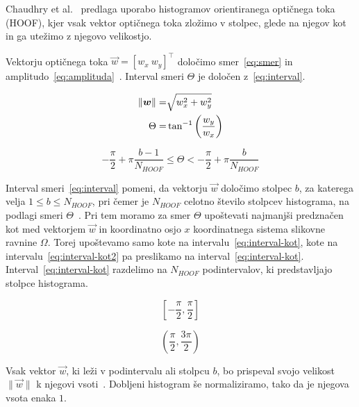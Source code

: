 Chaudhry et al.~\cite{chaudhry2009histograms} predlaga uporabo histogramov orientiranega optičnega toka (HOOF), kjer vsak vektor optičnega toka zložimo v stolpec, glede na njegov kot in ga utežimo z njegovo velikostjo.

Vektorju optičnega toka $\vec{w} = [w_x~w_y]^\top$ določimo smer~\eqref{eq:smer} in amplitudo~\eqref{eq:amplituda}~\cite{chaudhry2009histograms}. Interval smeri $\Theta$ je določen z~\eqref{eq:interval}. 

\begin{align}
    \left\lVert {\boldsymbol{w}} \right\rVert = & \sqrt{w_x^2 + w_y^2} \label{eq:amplituda} \\
    \Theta = & \tan^{-1}\left( \frac{w_y}{w_x} \right) \label{eq:smer}
\end{align}


\begin{equation}\label{eq:interval}
	-\frac{\pi}{2} + \pi \frac{b - 1}{N_{HOOF}} \leq \Theta < - \frac{\pi}{2} + \pi \frac{b}{N_{HOOF}}
\end{equation}


Interval smeri~\eqref{eq:interval} pomeni, da vektorju $\vec{w}$ določimo stolpec $b$, za katerega velja $1 \leq b \leq N_{HOOF}$, pri čemer je $N_{HOOF}$ celotno število stolpcev histograma, na podlagi smeri $\Theta$~\cite{chaudhry2009histograms}. Pri tem moramo za smer $\Theta$ upoštevati najmanjši predznačen kot med vektorjem $\vec{w}$ in koordinatno osjo $x$ koordinatnega sistema slikovne ravnine $\varOmega$. Torej upoštevamo samo kote na intervalu~\eqref{eq:interval-kot}, kote na intervalu~\eqref{eq:interval-kot2} pa preslikamo na interval~\eqref{eq:interval-kot}. Interval~\eqref{eq:interval-kot} razdelimo na $N_{HOOF}$ podintervalov, ki predstavljajo stolpce histograma. 

\begin{equation}\label{eq:interval-kot}
	\left[-\frac{\pi}{2}, \frac{\pi}{2}\right]
\end{equation}

\begin{equation}\label{eq:interval-kot2}
	\left(\frac{\pi}{2},\frac{3\pi}{2}\right)
\end{equation}

Vsak vektor $\vec{w}$, ki leži v podintervalu ali stolpcu $b$, bo prispeval svojo velikost $\|\vec{w} \|$ k njegovi vsoti~\cite{chaudhry2009histograms}. Dobljeni histogram še normaliziramo, tako da je njegova vsota enaka $1$.





